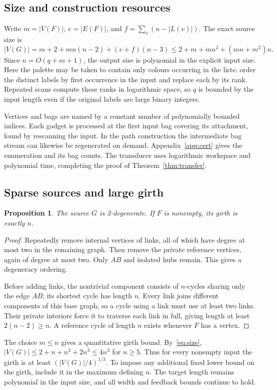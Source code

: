 \documentclass[11pt]{article}
\newtheorem{proposition}[theorem]{Proposition}
\theoremstyle{remark}
\begin{document}
\subsection{Size and construction resources}
Write $m=|V(F)|$, $e=|E(F)|$, and
$f=\sum_v(n-|L(v)|)$. The exact source size is
\begin{equation}\label{eq:size}
 |V(G)|=m+2+mn(n-2)+(e+f)(n-3)
 \leq 2+m+mn^2+(mn+m^2)n.
\end{equation}
Since $n=O(q+m+1)$, the output size is polynomial in the explicit input size.
Here the palette may be taken to contain only colours occurring in the
lists: order the distinct labels by first occurrence in the input and
replace each by its rank. Repeated scans compute these ranks in logarithmic
space, so $q$ is bounded by the input length even if the original labels
are large binary integers.

Vertices and bags are named by a constant number of polynomially bounded
indices. Each gadget is processed at the first input bag covering its
attachment, found by rescanning the input. In the path construction the
intermediate bag stream can likewise be regenerated on demand.
Appendix~\ref{app:cert} gives the enumeration and its bag counts. The
transducer uses logarithmic workspace and polynomial time, completing
the proof of Theorem~\ref{thm:transfer}.

\subsection{Sparse sources and large girth}\label{sec:sparse}
\begin{proposition}\label{prop:sparse}
The source $G$ is 2-degenerate. If $F$ is nonempty, its girth is exactly $n$.
\end{proposition}
\begin{proof}
Repeatedly remove internal vertices of links, all of which have degree
at most two in the remaining graph. Then remove the private reference
vertices, again of degree at most two. Only $AB$ and isolated hubs remain.
This gives a degeneracy ordering.

Before adding links, the nontrivial component consists of $n$-cycles sharing
only the edge $AB$; its shortest cycle has length $n$. Every link joins
different components of this base graph, so a cycle using a link must
use at least two links. Their private interiors force it to traverse
each link in full, giving length at least $2(n-2)\geq n$. A reference
cycle of length $n$ exists whenever $F$ has a vertex.
\end{proof}
The choice $m\leq n$ gives a quantitative girth bound.
By~\eqref{eq:size},
$|V(G)|\leq 2+n+n^3+2n^3\leq4n^3$ for $n\geq5$.
Thus for every nonempty input the girth is at least $(|V(G)|/4)^{1/3}$.
To impose any additional fixed lower bound on the girth, include it in the
maximum defining $n$. The target length remains polynomial in the input size,
and all width and feedback bounds continue to hold.
\end{document}
